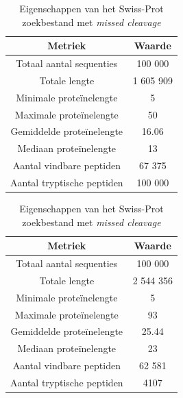 \documentclass[11pt,dutch,faculty=we,layout=titlefont,underline=false,titleUppercase=true,titleUnderline=true]{ugent2016-report}
\begin{document}
    \begin{table}[!h]
        \begin{minipage}{.5\linewidth}
            \centering
            \begin{tabular}{c c}
                Metriek                    & Waarde    \\
                \hline\hline
                Totaal aantal sequenties   & 100 000   \\
                Totale lengte              & 1 605 909 \\
                Minimale proteïnelengte    & 5         \\
                Maximale proteïnelengte    & 50        \\
                Gemiddelde proteïnelengte  & 16.06     \\
                Mediaan proteïnelengte     & 13        \\
                Aantal vindbare peptiden   & 67 375    \\
                Aantal tryptische peptiden & 100 000   \\
                \hline
            \end{tabular}
            \caption{Eigenschappen van \newline het Swiss-Prot zoekbestand \newline zonder \textit{missed cleavage}}
            \label{tab:swiss_geen_missed_cleavage}
        \end{minipage}
        \begin{minipage}{.5\linewidth}
            \centering
            \begin{tabular}{ c c }
                Metriek                    & Waarde    \\
                \hline\hline
                Totaal aantal sequenties   & 100 000   \\
                Totale lengte              & 2 544 356 \\
                Minimale proteïnelengte    & 5         \\
                Maximale proteïnelengte    & 93        \\
                Gemiddelde proteïnelengte  & 25.44     \\
                Mediaan proteïnelengte     & 23        \\
                Aantal vindbare peptiden   & 62 581    \\
                Aantal tryptische peptiden & 4107      \\
                \hline
            \end{tabular}
            \caption{Eigenschappen van \newline het Swiss-Prot zoekbestand \newline met \textit{missed cleavage}}
            \label{tab:swiss_missed_cleavage}
        \end{minipage}
    \end{table}
\end{document}
